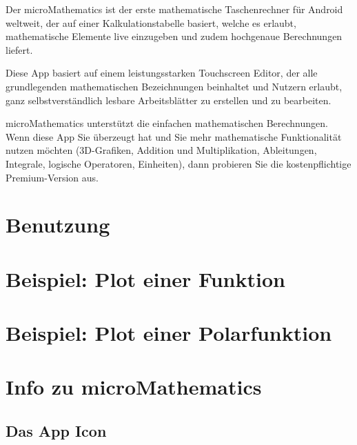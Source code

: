 \documentclass[DIV=calc, paper=a4, fontsize=11pt, twocolumn]{scrartcl}
\begin{document}
\maketitle
\thispagestyle{fancy} %

\begin{bf}
Der microMathematics ist der erste
mathematische Taschenrechner für
Android weltweit, der auf einer
Kalkulationstabelle basiert, welche es
erlaubt, mathematische Elemente live
einzugeben und zudem hochgenaue
Berechnungen liefert.

Diese App basiert auf einem
leistungsstarken Touchscreen Editor,
der alle grundlegenden mathematischen
Bezeichnungen beinhaltet und Nutzern
erlaubt, ganz selbstverständlich
lesbare Arbeitsblätter zu erstellen
und zu bearbeiten.

microMathematics unterstützt die
einfachen mathematischen Berechnungen.
Wenn diese App Sie überzeugt hat und
Sie mehr mathematische Funktionalität
nutzen möchten (3D-Grafiken, Addition
und Multiplikation, Ableitungen,
Integrale, logische Operatoren,
Einheiten), dann probieren Sie die
kostenpflichtige Premium-Version aus.
\end{bf}

\section{Benutzung}


\section{Beispiel: Plot einer Funktion}


\section{Beispiel: Plot einer Polarfunktion}


\section{Info zu microMathematics}

\subsection*{Das App Icon}
\end{document}
